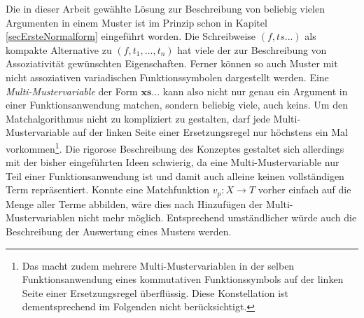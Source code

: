 Die in dieser Arbeit gewählte Lösung zur Beschreibung von beliebig vielen Argumenten in einem Muster ist im Prinzip schon in Kapitel \ref{secErsteNormalform} eingeführt worden. Die Schreibweise $(f, ts...)$ als kompakte Alternative zu $(f, t_1, \dots, t_n)$ hat viele der zur Beschreibung von Assoziativität gewünschten Eigenschaften. Ferner können so auch Muster mit nicht assoziativen variadischen Funktionssymbolen dargestellt werden. Eine \textit{Multi-Mustervariable} der Form $\mathbf{xs...}$ kann also nicht nur genau ein Argument in einer Funktionsanwendung matchen, sondern beliebig viele, auch keins. Um den Matchalgorithmus nicht zu kompliziert zu gestalten, darf jede Multi-Mustervariable auf der linken Seite einer Ersetzungsregel nur höchstens ein Mal vorkommen\footnote{Das macht zudem mehrere Multi-Mustervariablen in der selben Funktionsanwendung eines kommutativen Funktionssymbols auf der linken Seite einer Ersetzungsregel überflüssig. Diese Konstellation ist dementsprechend im Folgenden nicht berücksichtigt.}. Die rigorose Beschreibung des Konzeptes gestaltet sich allerdings mit der bisher eingeführten Ideen schwierig, da eine Multi-Mustervariable nur Teil einer Funktionsanwendung ist und damit auch alleine keinen vollständigen Term repräsentiert. Konnte eine Matchfunktion $v_p \colon X \rightarrow T$ vorher einfach auf die Menge aller Terme abbilden, wäre dies nach Hinzufügen der Multi-Mustervariablen nicht mehr möglich. Entsprechend umständlicher würde auch die Beschreibung der Auswertung eines Musters werden. \\

